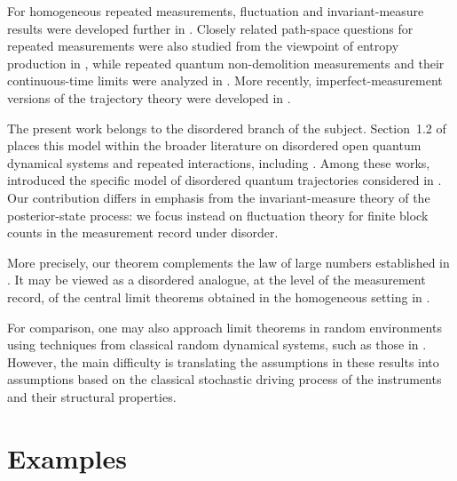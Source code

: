\documentclass[a4paper]{article}
\numberwithin{equation}{section}   %
\theoremstyle{plain}   %
\theoremstyle{plain}   %
\theoremstyle{examplestyle}
\begin{document}
    For homogeneous repeated measurements, fluctuation and invariant-measure results were developed further in \cite{Attal_2014,BFPP19,BFP23,BPS24,Benoist_2025}. 
    Closely related path-space questions for repeated measurements were also studied from the viewpoint of entropy production in \cite{BJPP18,Benoist_2021}, while repeated quantum non-demolition measurements and their continuous-time limits were analyzed in \cite{BBB13}. 
    More recently, imperfect-measurement versions of the trajectory theory were developed in \cite{tristant_2025}. 
    
    The present work belongs to the disordered branch of the subject. 
    Section~1.2 of \cite{qtlln} places this model within the broader literature on disordered open quantum dynamical systems and repeated interactions, including \cite{BJM08,PP09,Bru+09,BJM10,NP12,Bur+13,BJM14,MS21,BJP22,MS22,PS23,Raqu_pas_2025,ES24,traj}. 
    Among these works, \cite{traj} introduced the specific model of disordered quantum trajectories considered in \cite{qtlln}. 
    Our contribution differs in emphasis from the invariant-measure theory of the posterior-state process: we focus instead on fluctuation theory for finite block counts in the measurement record under disorder.
    
    More precisely, our theorem complements the law of large numbers established in \cite{qtlln}. It may be viewed as a disordered analogue, at the level of the measurement record, of the central limit theorems obtained in the homogeneous setting in \cite{Attal_2014}.
    
    For comparison, one may also approach limit theorems in random environments using techniques from classical random dynamical systems, such as those in \cite{Kifer_1998,HAFOUTA_2019,Hafouta_2023}.
    However, the main difficulty is translating the assumptions in these results into assumptions based on the classical stochastic driving process of the instruments and their structural properties. 


\section{Examples}
\label{section:examples}

\end{document}
